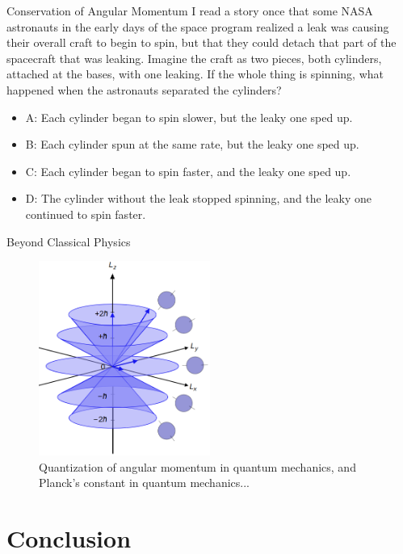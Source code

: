 \documentclass{beamer}
\begin{document}
\begin{frame}{Conservation of Angular Momentum}
\small
I read a story once that some NASA astronauts in the early days of the space program realized a leak was causing their overall craft to begin to spin, but that they could detach that part of the spacecraft that was leaking.  Imagine the craft as two pieces, both cylinders, attached at the bases, with one leaking.  If the whole thing is spinning, what happened when the astronauts separated the cylinders?
\begin{itemize}
\item A: Each cylinder began to spin slower, but the leaky one sped up.
\item B: Each cylinder spun at the same rate, but the leaky one sped up.
\item C: Each cylinder began to spin faster, and the leaky one sped up.
\item D: The cylinder without the leak stopped spinning, and the leaky one continued to spin faster.
\end{itemize}
\end{frame}

\begin{frame}{Beyond Classical Physics}
\begin{figure}
\centering
\includegraphics[width=0.5\textwidth]{figures/L.png}
\caption{\label{fig:L}  Quantization of angular momentum in quantum mechanics, and Planck's constant in quantum mechanics...}
\end{figure}
\end{frame}

\section{Conclusion}
\end{document}
